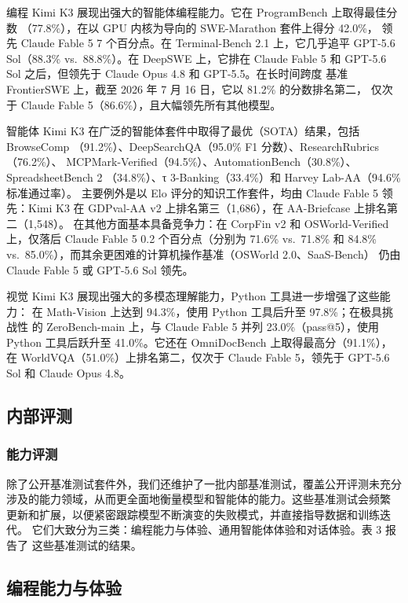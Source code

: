 编程 Kimi K3 展现出强大的智能体编程能力。它在 ProgramBench 上取得最佳分数
（77.8\%），在以 GPU 内核为导向的 SWE-Marathon 套件上得分 42.0\%，
领先 Claude Fable 5 7 个百分点。在 Terminal-Bench 2.1 上，它几乎追平
GPT-5.6 Sol（88.3\% vs.~88.8\%）。在 DeepSWE 上，它排在 Claude Fable 5
和 GPT-5.6 Sol 之后，但领先于 Claude Opus 4.8 和 GPT-5.5。在长时间跨度
基准 FrontierSWE 上，截至 2026 年 7 月 16 日，它以 81.2\% 的分数排名第二，
仅次于 Claude Fable 5（86.6\%），且大幅领先所有其他模型。

智能体 Kimi K3 在广泛的智能体套件中取得了最优（SOTA）结果，包括 BrowseComp
（91.2\%）、DeepSearchQA（95.0\% F1 分数）、ResearchRubrics（76.2\%）、
MCPMark-Verified（94.5\%）、AutomationBench（30.8\%）、SpreadsheetBench 2
（34.8\%）、τ 3-Banking（33.4\%）和 Harvey Lab-AA（94.6\% 标准通过率）。
主要例外是以 Elo 评分的知识工作套件，均由 Claude Fable 5 领先：Kimi K3
在 GDPval-AA v2 上排名第三（1,686），在 AA-Briefcase 上排名第二（1,548）。
在其他方面基本具备竞争力：在 CorpFin v2 和 OSWorld-Verified 上，仅落后
Claude Fable 5 0.2 个百分点（分别为 71.6\% vs.~71.8\% 和 84.8\%
vs.~85.0\%），而其余更困难的计算机操作基准（OSWorld 2.0、SaaS-Bench）
仍由 Claude Fable 5 或 GPT-5.6 Sol 领先。

视觉 Kimi K3 展现出强大的多模态理解能力，Python 工具进一步增强了这些能力：
在 Math-Vision 上达到 94.3\%，使用 Python 工具后升至 97.8\%；在极具挑战性
的 ZeroBench-main 上，与 Claude Fable 5 并列 23.0\%（pass@5），使用 Python
工具后跃升至 41.0\%。它还在 OmniDocBench 上取得最高分（91.1\%），在
WorldVQA（51.0\%）上排名第二，仅次于 Claude Fable 5，领先于 GPT-5.6 Sol
和 Claude Opus 4.8。

\subsection{内部评测}\label{internal-evaluation}

\subsubsection{能力评测}\label{capability-evaluation}

除了公开基准测试套件外，我们还维护了一批内部基准测试，覆盖公开评测未充分
涉及的能力领域，从而更全面地衡量模型和智能体的能力。这些基准测试会频繁
更新和扩展，以便紧密跟踪模型不断演变的失败模式，并直接指导数据和训练迭代。
它们大致分为三类：编程能力与体验、通用智能体体验和对话体验。表 3 报告了
这些基准测试的结果。

\subsection{编程能力与体验}\label{coding-capability-and-experience}

